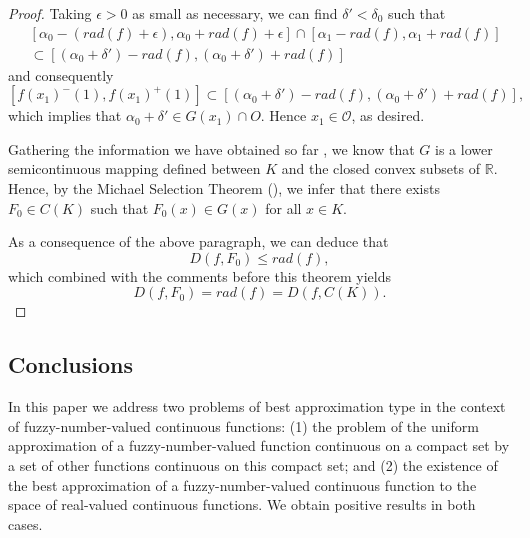 \documentclass[12pt]{amsart}
\begin{document}
\begin{proof}
Taking $\epsilon>0$ as small as necessary, we can find $\delta'<\delta_0$ such that
\begin{align*}
&[\alpha_0-(rad(f)+\epsilon),\alpha_0+rad(f)+\epsilon]\cap [\alpha_1-rad(f),\alpha_1+rad(f)]\\[1ex]
&\subset [(\alpha_0+\delta')-rad(f),(\alpha_0+\delta')+rad(f)]
\end{align*}
and consequently
\[
[f(x_1)^-(1),f(x_1)^+(1)]\subset [(\alpha_0+\delta')-rad(f),(\alpha_0+\delta')+rad(f)],
\]
which implies that $\alpha_0+\delta'\in G(x_1)\cap O$. Hence $x_1\in  \mathcal{O}$, as desired.

\bigskip
Gathering the information we have obtained so far , we know that $G$ is a lower semicontinuous mapping defined between $K$ and the closed convex subsets of $\mathbb{R}$. Hence, by the Michael Selection Theorem (\cite{Michael}), we infer that there exists $F_0\in C(K)$ such that $F_0(x)\in G(x)$ for all $x\in K$.

As a consequence of the above paragraph, we can deduce that
\[D(f,F_0) \le rad(f),\]
which combined with the comments before this theorem yields
\[D(f,F_0) = rad(f)=D(f,C(K)).\]

\end{proof}
\subsection*{Conclusions}

In this paper we address two problems of best approximation type in the context of fuzzy-number-valued continuous functions: (1) the problem of the uniform approximation of a fuzzy-number-valued
function continuous on a compact set by a set of other functions continuous on this compact set; and (2) the existence of the best approximation of a fuzzy-number-valued continuous function to the space of real-valued continuous functions. We obtain positive results in both cases.
\end{document}
